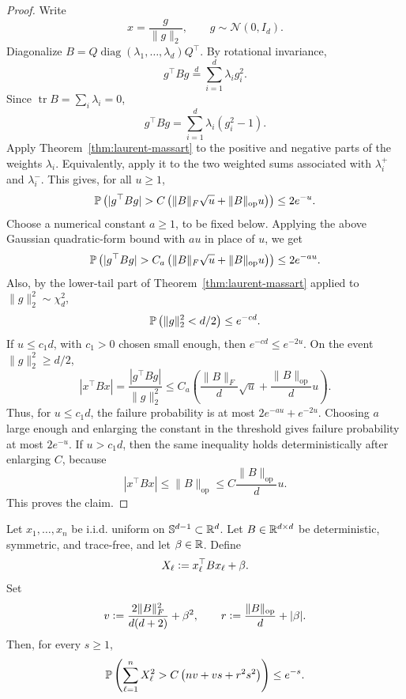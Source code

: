 \begin{proof}
Write
\[
x=\frac{g}{\|g\|_2},
\qquad
 g\sim\mathcal N(0,I_d).
\]
Diagonalize \(B=Q\operatorname{diag}(\lambda_1,\dots,\lambda_d)Q^\top\). By
rotational invariance,
\[
g^\top Bg
\stackrel{d}{=}
\sum_{i=1}^d\lambda_i g_i^2.
\]
Since \(\operatorname{tr}B=\sum_i\lambda_i=0\),
\[
g^\top Bg
=
\sum_{i=1}^d\lambda_i(g_i^2-1).
\]
Apply Theorem~\ref{thm:laurent-massart} to the positive and negative parts of the
weights \(\lambda_i\). Equivalently, apply it to the two weighted sums associated
with \(\lambda_i^+\) and \(\lambda_i^-\). This gives, for all \(u\ge1\),
\[
\mathbb{P}\left(
|g^\top Bg|
>
C\left(\|B\|_F\sqrt u+\|B\|_{\mathrm{op}}u\right)
\right)
\le
2e^{-u}.
\]
Choose a numerical constant \(a\ge1\), to be fixed below. Applying the above
Gaussian quadratic-form bound with \(au\) in place of \(u\), we get
\[
\mathbb{P}\left(
|g^\top Bg|
>
C_a\left(\|B\|_F\sqrt u+\|B\|_{\mathrm{op}}u\right)
\right)
\le 2e^{-au}.
\]
Also, by the lower-tail part of Theorem~\ref{thm:laurent-massart} applied to
\(\|g\|_2^2\sim\chi_d^2\),
\[
\mathbb{P}\left(\|g\|_2^2<d/2\right)
\le e^{-cd}.
\]
If \(u\le c_1d\), with \(c_1>0\) chosen small enough, then
\(e^{-cd}\le e^{-2u}\). On the event \(\|g\|_2^2\ge d/2\),
\[
|x^\top Bx|
=
\frac{|g^\top Bg|}{\|g\|_2^2}
\le
C_a\left(
\frac{\|B\|_F}{d}\sqrt u+
\frac{\|B\|_{\mathrm{op}}}{d}u
\right).
\]
Thus, for \(u\le c_1d\), the failure probability is at most
\(2e^{-au}+e^{-2u}\). Choosing \(a\) large enough and enlarging the constant in
the threshold gives failure probability at most \(2e^{-u}\).
If \(u>c_1d\), then the same inequality holds deterministically after
enlarging \(C\), because
\[
|x^\top Bx|\le\|B\|_{\mathrm{op}}
\le
C\frac{\|B\|_{\mathrm{op}}}{d}u.
\]
This proves the claim.
\end{proof}

\begin{lemma}
\label{lem:spherical-quad-square-sum}
Let \(x_1,\dots,x_n\) be i.i.d. uniform on \(\mathbb{S}^{d-1}\subset\mathbb{R}^d\). Let
\(B\in\mathbb{R}^{d\times d}\) be deterministic, symmetric, and trace-free, and let
\(\beta\in\mathbb{R}\). Define
\[
X_\ell\vcentcolon= x_\ell^\top Bx_\ell+\beta.
\]
Set
\[
v\vcentcolon= \frac{2\|B\|_F^2}{d(d+2)}+\beta^2,
\qquad
r\vcentcolon= \frac{\|B\|_{\mathrm{op}}}{d}+|\beta|.
\]
Then, for every \(s\ge1\),
\[
\mathbb{P}\left(
\sum_{\ell=1}^nX_\ell^2
>
C\left(nv+vs+r^2s^2\right)
\right)
\le
e^{-s}.
\]
\end{lemma}


